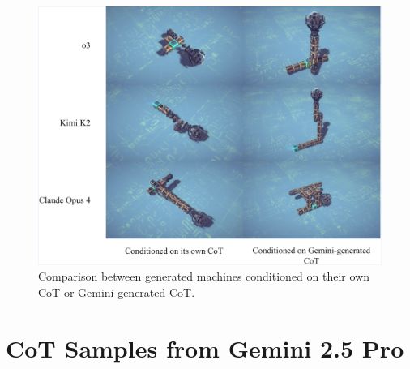 \begin{figure}[h!]
  \centering
  \includegraphics[width=\linewidth]{figures/LLM_feed_gemini_cot_v4_cropped.pdf}
  \caption{\footnotesize Comparison between generated machines conditioned on their own CoT or Gemini-generated CoT.}
  \label{fig:LLM-feed-gemini-cot}
\end{figure}

\clearpage
\newpage
\section{CoT Samples from Gemini 2.5 Pro}




